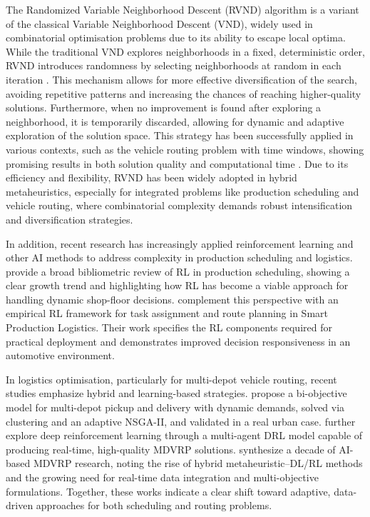 \documentclass{article}
\begin{document}
The Randomized Variable Neighborhood Descent (RVND) algorithm is a variant of the classical Variable Neighborhood Descent (VND), widely used in combinatorial optimisation problems due to its ability to escape local optima. While the traditional VND explores neighborhoods in a fixed, deterministic order, RVND introduces randomness by selecting neighborhoods at random in each iteration \cite{vasconcelos2021algoritmo}. This mechanism allows for more effective diversification of the search, avoiding repetitive patterns and increasing the chances of reaching higher-quality solutions. Furthermore, when no improvement is found after exploring a neighborhood, it is temporarily discarded, allowing for dynamic and adaptive exploration of the solution space. This strategy has been successfully applied in various contexts, such as the vehicle routing problem with time windows, showing promising results in both solution quality and computational time \cite{VIDAL2020401}. Due to its efficiency and flexibility, RVND has been widely adopted in hybrid metaheuristics, especially for integrated problems like production scheduling and vehicle routing, where combinatorial complexity demands robust intensification and diversification strategies.

In addition, recent research has increasingly applied reinforcement learning and other AI methods to address complexity in production scheduling and logistics. \cite{Modrak2024} provide a broad bibliometric review of RL in production scheduling, showing a clear growth trend and highlighting how RL has become a viable approach for handling dynamic shop-floor decisions. \cite{JEONG2021} complement this perspective with an empirical RL framework for task assignment and route planning in Smart Production Logistics. Their work specifies the RL components required for practical deployment and demonstrates improved decision responsiveness in an automotive environment.

In logistics optimisation, particularly for multi-depot vehicle routing, recent studies emphasize hybrid and learning-based strategies. \cite{Wangetal2013} propose a bi-objective model for multi-depot pickup and delivery with dynamic demands, solved via clustering and an adaptive NSGA-II, and validated in a real urban case. \cite{Arishi2023} further explore deep reinforcement learning through a multi-agent DRL model capable of producing real-time, high-quality MDVRP solutions. \cite{WANG2025} synthesize a decade of AI-based MDVRP research, noting the rise of hybrid metaheuristic–DL/RL methods and the growing need for real-time data integration and multi-objective formulations. Together, these works indicate a clear shift toward adaptive, data-driven approaches for both scheduling and routing problems.
\end{document}

